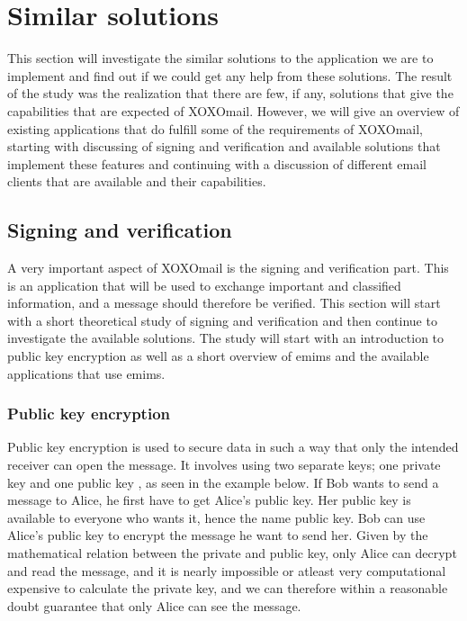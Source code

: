 \section{Similar solutions}\label{sec:similarsol}

This section will investigate the similar solutions to the application we are to implement and find out if we could get any help from these solutions. The result of the study was the realization that there are few, if any, solutions that give the capabilities that are expected of XOXOmail. However, we will give an overview of existing applications that do fulfill some of the requirements of XOXOmail, starting with discussing of signing and verification and available solutions that implement these features and continuing with a discussion of different email clients that are available and their capabilities.

\subsection{Signing and verification}

A very important aspect of XOXOmail is the signing and verification part. This is an application that will be used to exchange important and classified information, and a message should therefore be verified. This section will start with a short theoretical study of signing and verification and then continue to investigate the available solutions. The study will start with an introduction to public key encryption as well as a short overview of \gls{emims} and the available applications that use \gls{emims}.

\newpage

\subsubsection{Public key encryption}
Public key encryption is used to secure data in such a way that only the intended receiver can open the message. It involves using two separate keys; one private key and one public key \cite{bib:pke},
as seen in the example below.
\newline
\newline
If Bob wants to send a message to Alice, he first have to get Alice's public key. Her public key is available to everyone who wants it, hence the name public key. Bob can use Alice's public key to encrypt the message he want to send her. Given by the mathematical relation between the private and public key, only Alice can decrypt and read the message, and it is nearly impossible or atleast very computational expensive to calculate the private key, and we can therefore within a reasonable doubt guarantee that only Alice can see the message.


